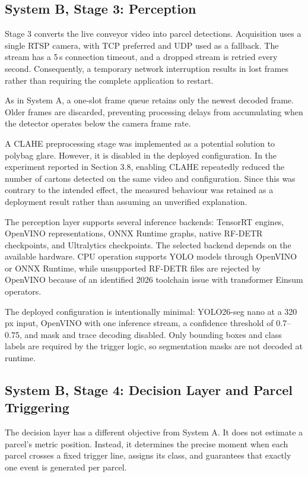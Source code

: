 \documentclass[9pt,a4paper,twocolumn]{rho-class/rho}
\begin{document}
\subsection{System B, Stage 3: Perception}

Stage 3 converts the live conveyor video into parcel detections. Acquisition uses a single RTSP camera, with TCP preferred and UDP used as a fallback. The stream has a 5\,s connection timeout, and a dropped stream is retried every second. Consequently, a temporary network interruption results in lost frames rather than requiring the complete application to restart.

As in System A, a one-slot frame queue retains only the newest decoded frame. Older frames are discarded, preventing processing delays from accumulating when the detector operates below the camera frame rate.

A CLAHE preprocessing stage was implemented as a potential solution to polybag glare. However, it is disabled in the deployed configuration. In the experiment reported in Section 3.8, enabling CLAHE repeatedly reduced the number of cartons detected on the same video and configuration. Since this was contrary to the intended effect, the measured behaviour was retained as a deployment result rather than assuming an unverified explanation.

The perception layer supports several inference backends: TensorRT engines, OpenVINO representations, ONNX Runtime graphs, native RF-DETR checkpoints, and Ultralytics checkpoints. The selected backend depends on the available hardware. CPU operation supports YOLO models through OpenVINO or ONNX Runtime, while unsupported RF-DETR files are rejected by OpenVINO because of an identified 2026 toolchain issue with transformer Einsum operators.

The deployed configuration is intentionally minimal: YOLO26-seg nano at a 320\,px input, OpenVINO with one inference stream, a confidence threshold of 0.7--0.75, and mask and trace decoding disabled. Only bounding boxes and class labels are required by the trigger logic, so segmentation masks are not decoded at runtime.

\subsection{System B, Stage 4: Decision Layer and Parcel Triggering}

The decision layer has a different objective from System A. It does not estimate a parcel's metric position. Instead, it determines the precise moment when each parcel crosses a fixed trigger line, assigns its class, and guarantees that exactly one event is generated per parcel.
\end{document}

